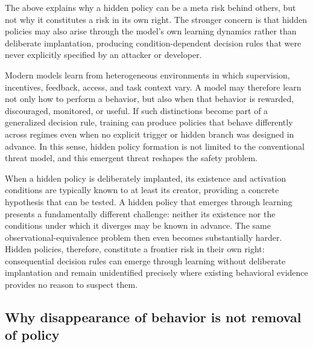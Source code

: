 \documentclass{article}
\begin{document}
The above explains why a hidden policy can be a meta risk behind others, but not why it constitutes a risk in its own right. The stronger concern is that hidden policies may also arise through the model's own learning dynamics rather than deliberate implantation, producing condition-dependent decision rules that were never explicitly specified by an attacker or developer.

Modern models learn from heterogeneous environments in which supervision, incentives, feedback, access, and task context vary. A model may therefore learn not only how to perform a behavior, but also when that behavior is rewarded, discouraged, monitored, or useful. If such distinctions become part of a generalized decision rule, training can produce policies that behave differently across regimes even when no explicit trigger or hidden branch was designed in advance. In this sense, hidden policy formation is not limited to the conventional threat model, and this emergent threat reshapes the safety problem.

When a hidden policy is deliberately implanted, its existence and activation conditions are typically known to at least its creator, providing a concrete hypothesis that can be tested. A hidden policy that emerges through learning presents a fundamentally different challenge: neither its existence nor the conditions under which it diverges may be known in advance. The same observational-equivalence problem then even becomes substantially harder. Hidden policies, therefore, constitute a frontier risk in their own right: consequential decision rules can emerge through learning without deliberate implantation and remain unidentified precisely where existing behavioral evidence provides no reason to suspect them.


\subsection{Why disappearance of behavior is not removal of policy}
\end{document}
